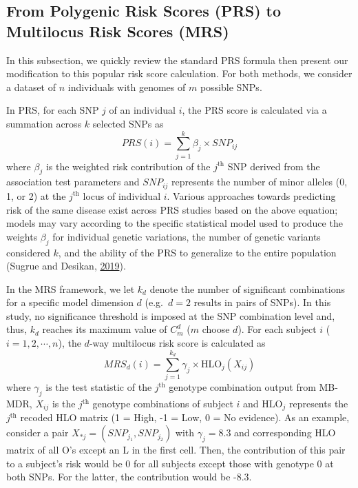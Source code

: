 \documentclass{ws-procs11x85}
\begin{document}
\subsection{From Polygenic Risk Scores (PRS) to Multilocus Risk
Scores
(MRS)}\label{from-polygenic-risk-scores-prs-to-multilocus-risk-scores-mrs}

In this subsection, we quickly review the standard PRS formula then
present our modification to this popular risk score calculation. For
both methods, we consider a dataset of \(n\) individuals with genomes of
\(m\) possible SNPs.

In PRS, for each SNP \(j\) of an individual \(i\), the PRS score is
calculated via a summation across \(k\) selected SNPs as
\[PRS(i)=\sum_{j=1}^{k} \beta_j \times SNP_{ij}\] where \(\beta_j\) is
the weighted risk contribution of the \(j^\textrm{th}\) SNP derived from
the association test parameters and \(SNP_{ij}\) represents the number
of minor alleles (0, 1, or 2) at the \(j^\textrm{th}\) locus of
individual \(i\). Various approaches towards predicting risk of the same
disease exist across PRS studies based on the above equation; models may
vary according to the specific statistical model used to produce the
weights \(\beta_j\) for individual genetic variations, the number of
genetic variants considered \(k\), and the ability of the PRS to
generalize to the entire population (Sugrue and Desikan,
\protect\hyperlink{ref-1Dlv3tAGh}{2019}).

In the MRS framework, we let \(k_d\) denote the number of significant
combinations for a specific model dimension \(d\) (e.g.~\(d = 2\)
results in pairs of SNPs). In this study, no significance threshold is
imposed at the SNP combination level and, thus, \(k_d\) reaches its
maximum value of \(C^d_m\) (\(m\) choose \(d\)). For each subject \(i\)
(\(i = 1,2, \dotsm, n\)), the \(d\)-way multilocus risk score is
calculated as
\[MRS_d(i) = \sum_{j = 1}^{k_d} \gamma_j \times \textrm{HLO}_j(X_{ij})\]
where \(\gamma_j\) is the test statistic of the \(j^\textrm{th}\)
genotype combination output from MB-MDR, \(X_{ij}\) is the
\(j^\textrm{th}\) genotype combinations of subject \(i\) and
\(\textrm{HLO}_j\) represents the \(j^\textrm{th}\) recoded HLO matrix
(1 = High, -1 = Low, 0 = No evidence). As an example, consider a pair
\(X_{*j} = (SNP_{j_1}, SNP_{j_2})\) with \(\gamma_j=8.3\) and
corresponding HLO matrix of all O's except an L in the first cell.
Then, the contribution of this pair to a subject's risk would be 0 for all subjects except those with genotype 0 at both SNPs.
For the latter, the contribution would be -8.3.
\end{document}
